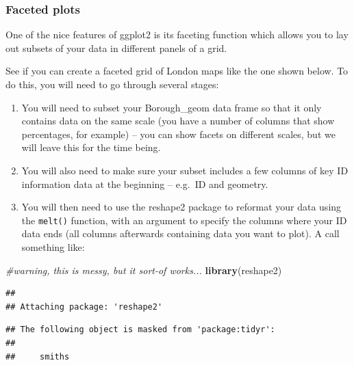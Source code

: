 \documentclass[]{book}
\newenvironment{Shaded}{\begin{snugshade}}{\end{snugshade}}
\newcommand{\CommentTok}[1]{\textcolor[rgb]{0.56,0.35,0.01}{\textit{#1}}}
\newcommand{\KeywordTok}[1]{\textcolor[rgb]{0.13,0.29,0.53}{\textbf{#1}}}
\newcommand{\NormalTok}[1]{#1}
\begin{document}
\hypertarget{faceted-plots}{%
\subsubsection{Faceted plots}\label{faceted-plots}}

One of the nice features of ggplot2 is its faceting function which allows you to lay out subsets of your data in different panels of a grid.

See if you can create a faceted grid of London maps like the one shown below. To do this, you will need to go through several stages:

\begin{enumerate}
\def\labelenumi{\arabic{enumi}.}
\item
  You will need to subset your Borough\_geom data frame so that it only contains data on the same scale (you have a number of columns that show percentages, for example) -- you can show facets on different scales, but we will leave this for the time being.
\item
  You will also need to make sure your subset includes a few columns of key ID information data at the beginning -- e.g.~ID and geometry.
\item
  You will then need to use the reshape2 package to reformat your data using the \texttt{melt()} function, with an argument to specify the columns where your ID data ends (all columns afterwards containing data you want to plot). A call something like:
\end{enumerate}

\begin{Shaded}
\begin{Highlighting}[]
\CommentTok{#warning, this is messy, but it sort-of works...}
\KeywordTok{library}\NormalTok{(reshape2)}
\end{Highlighting}
\end{Shaded}

\begin{verbatim}
## 
## Attaching package: 'reshape2'
\end{verbatim}

\begin{verbatim}
## The following object is masked from 'package:tidyr':
## 
##     smiths
\end{verbatim}
\end{document}
